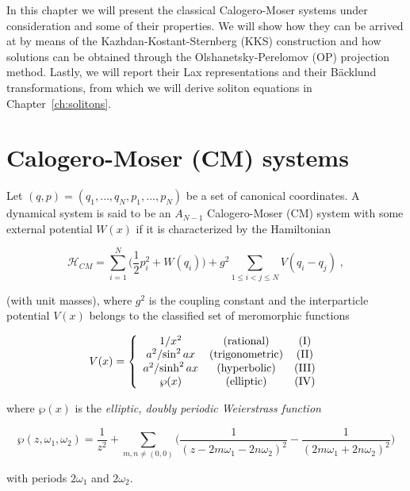 In this chapter we will present the classical Calogero-Moser systems under consideration and some of their properties. We will show how they can be arrived at by means of the Kazhdan-Kostant-Sternberg (KKS) construction and how solutions can be obtained through the Olshanetsky-Perelomov (OP) projection method. Lastly, we will report their Lax representations and their Bäcklund transformations, from which we will derive soliton equations in Chapter~\ref{ch:solitons}.


\section{Calogero-Moser (CM) systems}

\begin{defi}
Let $(q, p) = (q_1, \dots, q_N, p_1, \dots, p_N)$ be a set of canonical coordinates. A dynamical system is said to be an $A_{N-1}$ Calogero-Moser \textnormal{(CM)} system with some external potential $W(x)$ if it is characterized by the Hamiltonian

\begin{equation}
\mathcal{H}_{CM} = \sum_{i=1}^N \Big(\frac{1}{2} p_i^2 + W(q_i)\Big) + g^2 \sum_{1 \leq i < j \leq N} V(q_i - q_j)\;,
\end{equation}

(with unit masses), where $g^2$ is the coupling constant and the interparticle potential $V (x)$ belongs to the classified set of meromorphic functions

\[V(x) = \left \{ \begin{array}{ccc}
{1}/{x^2} & \textnormal{(rational)} & \textnormal{(I)}\\
{a^2}/{\sin^2{ax}} & \textnormal{(trigonometric)} & \textnormal{(II)}\\
{a^2}/{\sinh^2{ax}} & \textnormal{(hyperbolic)} & \textnormal{(III)}\\
\wp (x) & \textnormal{(elliptic)} & \textnormal{(IV)}
\end{array}
\right.\]

where $\wp (x)$ is the \textit{elliptic, doubly periodic Weierstrass function}

\begin{equation}
    \wp (z, \omega_1, \omega_2) = \frac{1}{z^2} + \sum_{m, n \neq (0,0)} \Big (  \frac{1}{(z - 2m\omega_1 - 2n\omega_2)^2} - \frac{1}{(2m\omega_1 + 2n\omega_2)^2}\Big )
\end{equation}

with periods $2\omega_1$ and $2\omega_2$.
\end{defi}

